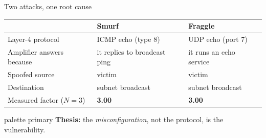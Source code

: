 \documentclass[aspectratio=169,10pt]{beamer}
\begin{document}
\begin{frame}{Two attacks, one root cause}
  \centering
  \begin{tabular}{@{}lll@{}}
    \toprule
     & \textbf{Smurf} & \textbf{Fraggle} \\
    \midrule
    Layer-4 protocol      & ICMP echo (type 8) & UDP echo (port 7) \\
    Amplifier answers because & it replies to broadcast ping & it runs an echo service \\
    Spoofed source        & victim & victim \\
    Destination           & subnet broadcast & subnet broadcast \\
    Measured factor ($N{=}3$) & \textbf{3.00} & \textbf{3.00} \\
    \bottomrule
  \end{tabular}

  \vspace{6pt}
  \begin{beamercolorbox}[wd=0.9\textwidth,center,rounded=true,shadow=false]{palette primary}
    \small\textbf{Thesis:} the \emph{misconfiguration}, not the protocol, is the vulnerability.
  \end{beamercolorbox}
\end{frame}

\end{document}
